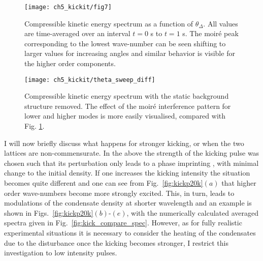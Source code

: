 	\begin{figure}[ht]
        \centering
		\texttt{[image: ch5\_kickit/fig7]}
		\caption[Compressible kinetic energy spectrum as a function of $\theta_\Delta$.]{Compressible kinetic energy spectrum as a function of $\theta_\Delta$. All values are time-averaged over an interval $t=0$ s to $t=1$ s. The moir\'e peak corresponding to the lowest wave-number can be seen shifting to larger values for increasing angles and similar behavior is visible for the higher order components.}
		\label{fig:dtheta_kspec}
	\end{figure}
    \begin{figure}[ht]
        \centering
        \texttt{[image: ch5\_kickit/theta\_sweep\_diff]}
        \caption[Compressible kinetic energy spectrum with the background structure removed.]{Compressible kinetic energy spectrum with the static background structure removed. The effect of the moir\'e interference pattern for lower and higher modes is more easily visualised, compared with Fig. \ref{fig:dtheta_kspec}.}
        \label{fig:dtheta_kspec_backg}
    \end{figure}

    I will now briefly discuss what happens for stronger kicking, or when the two lattices are non-commensurate. In the above the strength of the kicking pulse was chosen such that its perturbation only leads to a phase imprinting \cite{Vtx:Dobrek_pra_1999,BEC:Denschlag_sci_2000}, with minimal change to the initial density. If one increases the kicking intensity the situation becomes quite different and one can see from Fig.~\ref{fig:kickp20k}$(a)$ that higher order wave-numbers become more strongly excited. This, in turn, leads to modulations of the condensate density at shorter wavelength and an example is shown in Figs.~\ref{fig:kickp20k}$(b)$-$(e)$, with the numerically calculated averaged spectra given in Fig.~\ref{fig:kick_compare_spec}. However, as for fully realistic experimental situations it is necessary to consider the heating of the condensates due to the disturbance once the kicking becomes stronger, I restrict this investigation to low intensity pulses.

